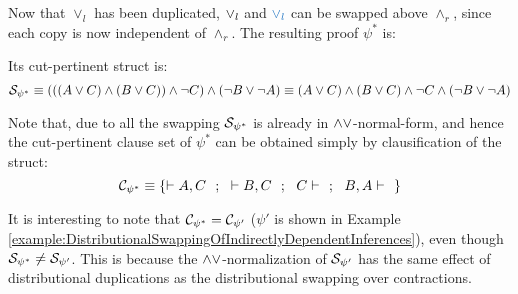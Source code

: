 \documentclass{llncs}
\begin{document}
\begin{example}[Swapping]


Now that $\vee_l$ has been duplicated, $\hA{\vee_l}$ and $\hB{\vee_l}$ can be swapped above $\wedge_r$, since each copy is now independent of $\wedge_r$. The resulting proof $\psi^*$ is:
\begin{scriptsize}
\begin{prooftree}
 
 
		   		
				 
				 
						   		
			  		
						 
							 
						 
						  
\end{prooftree}
\end{scriptsize}
Its cut-pertinent struct is:
$$
\cutpertstruct{\psi^*} 
\equiv 
(((A\structtimes C) \structplus (B\structtimes C)) \structplus \structdual{C}) \structplus (\structdual{B} \structtimes \structdual{A})
\equiv 
(A\structtimes C) \structplus (B\structtimes C) \structplus \structdual{C} \structplus (\structdual{B} \structtimes \structdual{A})
$$

Note that, due to all the swapping $
\cutpertstruct{\psi^*}$ is already in $\structplus\structtimes$-normal-form, and hence the cut-pertinent clause set of $\psi^*$ can be obtained simply by clausification of the struct: 
$$
\clauseset{\psi^*} \equiv \{ \seq A,C \ \ ; \ \ \seq B,C \ \ ; \ \ C \seq \ \ ; \ \ B, A \seq \ \  \}
$$

It is interesting to note that $\clauseset{\psi^*} = \clauseset{\psi'}$ ($\psi'$ is shown in Example \ref{example:DistributionalSwappingOfIndirectlyDependentInferences}), even though $\cutpertstruct{\psi^*} \neq \cutpertstruct{\psi'}$. This is because the $\structplus\structtimes$-normalization of $\cutpertstruct{\psi'}$ has the same effect of distributional duplications as the distributional swapping over contractions.
\end{example}
\end{document}
